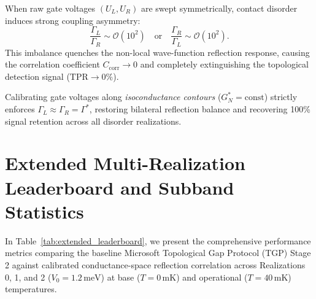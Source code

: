 \documentclass[aps,prb,reprint,superscriptaddress,showpacs,amsmath,amssymb]{revtex4-2}
\begin{document}
When raw gate voltages $(U_L, U_R)$ are swept symmetrically, contact disorder induces strong coupling asymmetry:
\begin{equation}
\frac{\Gamma_L}{\Gamma_R} \sim \mathcal{O}(10^2) \quad \text{or} \quad \frac{\Gamma_R}{\Gamma_L} \sim \mathcal{O}(10^2).
\label{eq:coupling_imbalance}
\end{equation}
This imbalance quenches the non-local wave-function reflection response, causing the correlation coefficient $C_{\mathrm{corr}} \to 0$ and completely extinguishing the topological detection signal ($\mathrm{TPR} \to 0\%$). 

Calibrating gate voltages along \emph{isoconductance contours} ($G_N^* = \mathrm{const}$) strictly enforces $\Gamma_L \approx \Gamma_R = \Gamma^*$, restoring bilateral reflection balance and recovering 100\% signal retention across all disorder realizations.

\section{Extended Multi-Realization Leaderboard and Subband Statistics}
\label{sec:extended_leaderboard}

In Table~\ref{tab:extended_leaderboard}, we present the comprehensive performance metrics comparing the baseline Microsoft Topological Gap Protocol (TGP) Stage 2 against calibrated conductance-space reflection correlation across Realizations 0, 1, and 2 ($V_0 = 1.2\,\mathrm{meV}$) at base ($T = 0\,\mathrm{mK}$) and operational ($T = 40\,\mathrm{mK}$) temperatures.
\end{document}
